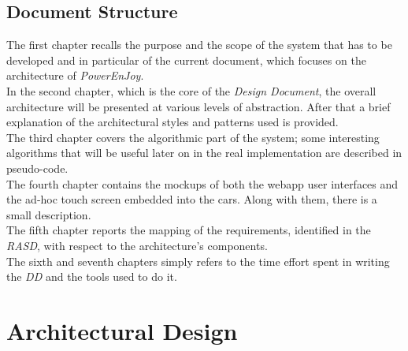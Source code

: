 \documentclass[11pt,a4paper]{report}
\begin{document}
\section{Document Structure}
The first chapter recalls the purpose and the scope of the system that has to be developed and in particular of the current document, which focuses on the architecture of \textit{PowerEnJoy}.\\
In the second chapter, which is the core of the \textit{Design Document},
the overall architecture will be presented at various levels of abstraction. After that a brief explanation of the architectural styles and patterns used is provided.\\
The third chapter covers the algorithmic part of the system; some interesting algorithms that will be useful later on in the real implementation are described in pseudo-code.\\
The fourth chapter contains the mockups of both the webapp user interfaces and the ad-hoc touch screen embedded into the cars. Along with them, there is a small description.\\
The fifth chapter reports the mapping of the requirements, identified in the \textit{RASD}, with respect to the architecture's components.\\
The sixth and seventh chapters simply refers to the time effort spent in writing the \textit{DD} and the tools used to do it.
\chapter{Architectural Design}
\end{document}

